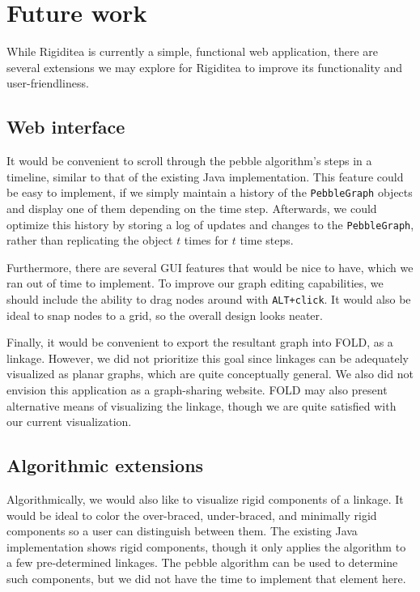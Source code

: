 \documentclass[aps,prd,final,twocolumn,letterpaper,nofootinbib]{revtex4-1}
\begin{document}
\section{Future work}

While Rigiditea is currently a simple, functional web application,
there are several extensions we may explore for Rigiditea
to improve its functionality and user-friendliness.

\subsection{Web interface}

It would be convenient to scroll through the pebble algorithm's steps
in a timeline, similar to that of the existing Java implementation.
This feature could be easy to implement,
if we simply maintain a history of the \texttt{PebbleGraph} objects
and display one of them depending on the time step.
Afterwards, we could optimize this history by storing a log
of updates and changes to the \texttt{PebbleGraph},
rather than replicating the object $t$ times for $t$ time steps.

Furthermore, there are several GUI features that would be nice to have,
which we ran out of time to implement.
To improve our graph editing capabilities,
we should include the ability to drag nodes around with \texttt{ALT+click}.
It would also be ideal to snap nodes to a grid,
so the overall design looks neater.

Finally, it would be convenient to export the resultant graph into FOLD,
as a linkage. However, we did not prioritize this goal since
linkages can be adequately visualized as planar graphs,
which are quite conceptually general.
We also did not envision this application as a graph-sharing website.
FOLD may also present alternative means of visualizing the linkage,
though we are quite satisfied with our current visualization.

\subsection{Algorithmic extensions}

Algorithmically, we would also like to visualize rigid components of a linkage.
It would be ideal to color the over-braced,
under-braced, and minimally rigid components so a user
can distinguish between them.
The existing Java implementation shows rigid components,
though it only applies the algorithm to a few pre-determined linkages.
The pebble algorithm can be used to determine such components,
but we did not have the time to implement that element here.
\end{document}
